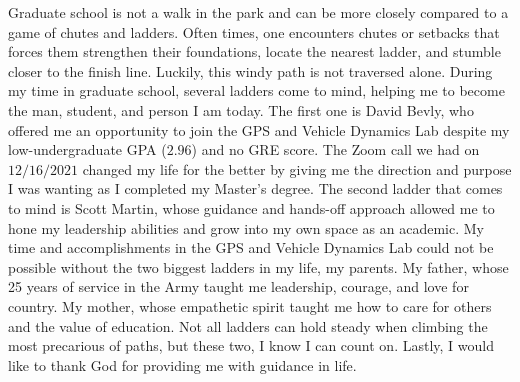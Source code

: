 \documentclass[12pt]{report}
\begin{document}
\begin{romanpages}
  \begin{acknowledgments}
    Graduate school is not a walk in the park and can be more closely compared to a game of chutes and ladders. Often times, one encounters chutes or setbacks that forces them strengthen their foundations, locate the nearest ladder, and stumble closer to the finish line. Luckily, this windy path is not traversed alone. During my time in graduate school, several ladders come to mind, helping me to become the man, student, and person I am today. The first one is David Bevly, who offered me an opportunity to join the GPS and Vehicle Dynamics Lab despite my low-undergraduate GPA (\(2.96\)) and no GRE score. The Zoom call we had on \(12/16/2021\) changed my life for the better by giving me the direction and purpose I was wanting as I completed my Master's degree. The second ladder that comes to mind is Scott Martin, whose guidance and hands-off approach allowed me to hone my leadership abilities and grow into my own space as an academic. My time and accomplishments in the GPS and Vehicle Dynamics Lab could not be possible without the two biggest ladders in my life, my parents. My father, whose 25 years of service in the Army taught me leadership, courage, and love for country. My mother, whose empathetic spirit taught me how to care for others and the value of education. Not all ladders can hold steady when climbing the most precarious of paths, but these two, I know I can count on. Lastly, I would like to thank God for providing me with guidance in life.
  \end{acknowledgments}


  \begin{singlespace}

    \begin{center}
      \renewcommand{\cftchapfont}{}
      \renewcommand{\cftchappagefont}{}
      \renewcommand{\cfttoctitlefont}{\normalsize}%
      \renewcommand{\cftsecfont}{\normalsize}%
      \renewcommand{\cftsecpagefont}{\normalsize}%
      \tableofcontents
      \newpage
      \renewcommand{\cftchapfont}{}
      \renewcommand{\cftchappagefont}{}
      \renewcommand{\cftloftitlefont}{\normalsize}%
      \renewcommand{\cftsecfont}{\normalsize}%
      \renewcommand{\cftsecpagefont}{\normalsize}%
      \listoffigures
      \newpage
      \renewcommand{\cftchapfont}{}
      \renewcommand{\cftchappagefont}{}
      \renewcommand{\cftlottitlefont}{\normalsize}%
      \renewcommand{\cftsecfont}{\normalsize}%
      \renewcommand{\cftsecpagefont}{\normalsize}%
      \listoftables
    \end{center}
  \end{singlespace}


\end{romanpages}
\end{document}
